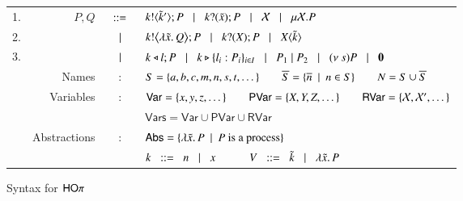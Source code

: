 \begin{figure}[t!]
		\begin{tabular}{lrcl}
			1. &	$P,Q$
			 	&$\;\;::=\;\;$&	$k ! \langle \tilde{k}' \rangle ; P \;\;\;|\;\;\; k ? (\tilde{x}) ; P \;\;\;|\;\;\; \mathcal{X} \;\;\;|\;\;\; \mu \mathcal{X}. P$ \\
			2. & 	&$\;\;\;|\;\;\;$&	$k ! \big\langle \lambda \tilde{x}.\,Q \big\rangle ; P \;\;\;|\;\;\; k ? (X) ; P \;\;\;|\;\;\; X\langle \tilde{k} \rangle$ \\ 
			3. & 	&$\;\;\;|\;\;\;$&	$k \triangleleft l ; P \;\;\;|\;\;\; k \triangleright \{l_i:P_i\}_{i \in I} \;\;\;|\;\;\; 
						P_1 \;|\; P_2 \;\;\;|\;\;\; (\nu\ s) P \;\;\;|\;\;\; \mathbf{0}$ \\
		&	Names & : & 	$S = \{a, b, c, m, n, s, t, \dots\} \qquad \overline{S} = \{\overline{n} \ \ |\ \  n \in S\} \qquad N = S \cup \overline{S}$\\
		&	Variables & : &	$\mathsf{Var} = \{x,y,z, \dots\} \qquad \mathsf{PVar} = \{X, Y, Z, \dots\}
					\qquad \mathsf{RVar} = \{\mathcal{X}, \mathcal{X}', \dots\}$\\
		&		& &	$\mathsf{Vars} = \mathsf{Var} \cup \mathsf{PVar} \cup \mathsf{RVar}$\\
		&	Abstractions & : & $\mathsf{Abs} = \{\lambda \tilde{x}.\,P \ \ |\ \  P \textrm{ is a process}\}$\\
		&		& &	$k \;\;::=\;\; n \;\;\;|\;\;\; x \quad \qquad V \;\;::=\;\; \tilde{k} \;\;\;|\;\;\; \lambda \tilde{x}.\,P$
		\end{tabular}
	\caption{Syntax for $\mathsf{HO}\pi$ \label{fig:syntax}}
\end{figure}

